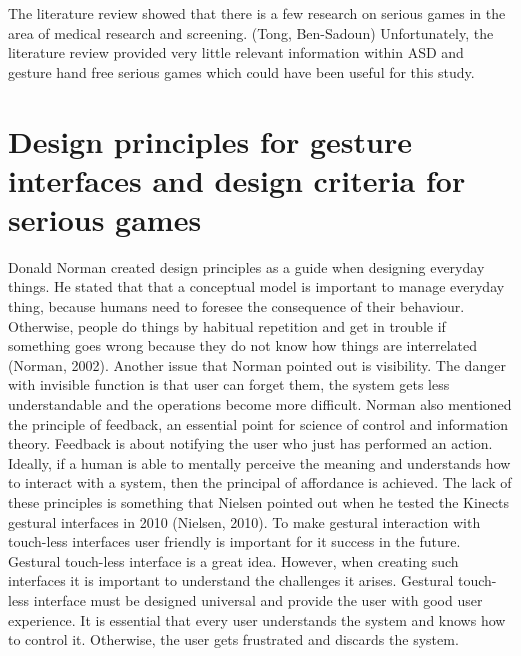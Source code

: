 The literature review showed that there is a few research on serious games in the area of medical research and screening. (Tong, Ben-Sadoun) Unfortunately, the literature review provided very little relevant information within ASD and gesture hand free serious games which could have been useful for this study.



\section{Design principles for gesture interfaces and design criteria for serious games}
\label{sec:designprinciples}
Donald Norman created design principles as a guide when designing everyday things. He stated that that a conceptual model is important to manage everyday thing, because humans need to foresee the consequence of their behaviour. Otherwise, people do things by habitual repetition and get in trouble if something goes wrong because they do not know how things are interrelated (Norman, 2002). Another issue that Norman pointed out is visibility. The danger with invisible function is that user can forget them, the system gets less understandable and the operations become more difficult. Norman also mentioned the principle of feedback, an essential point for science of control and information theory. Feedback is about notifying the user who just has performed an action. Ideally, if a human is able to mentally perceive the meaning and understands how to interact with a system, then the principal of affordance is achieved. The lack of these principles is something that Nielsen pointed out when he tested the Kinects gestural interfaces in 2010 (Nielsen, 2010).  To make gestural interaction with touch-less interfaces user friendly is important for it success in the future. 
Gestural touch-less interface is a great idea. However, when creating such interfaces it is important to understand the challenges it arises. Gestural touch-less interface must be designed universal and provide the user with good user experience. It is essential that every user understands the system and knows how to control it. Otherwise, the user gets frustrated and discards the system. 

